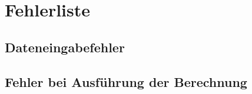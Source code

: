 \section{Fehlerliste}

\subsection{Dateneingabefehler}


\subsection{Fehler bei Ausf\"{u}hrung der Berechnung}

